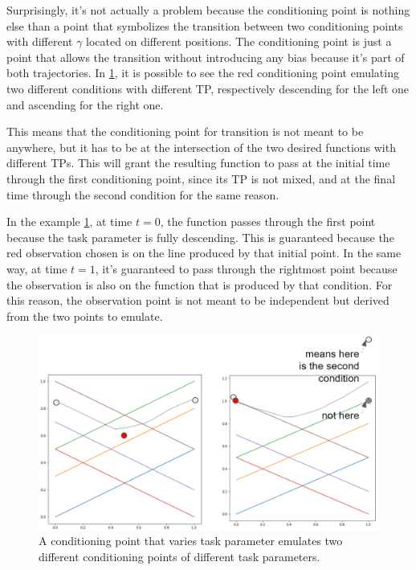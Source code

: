 Surprisingly, it's not actually a problem because the conditioning point is nothing else than a point that symbolizes the transition between two conditioning points with different $\gamma$ located on different positions. The conditioning point is just a point that allows the transition without introducing any bias because it's part of both trajectories. In \cref{fig:tp-condition-point-meaning}, it is possible to see the red conditioning point emulating two different conditions with different TP, respectively descending for the left one and ascending for the right one.

This means that the conditioning point for transition is not meant to be anywhere, but it has to be at the intersection of the two desired functions with different TPs. This will grant the resulting function to pass at the initial time through the first conditioning point, since its TP is not mixed, and at the final time through the second condition for the same reason. 

In the example \cref{fig:tp-condition-point-meaning}, at time $t=0$, the function passes through the first point because the task parameter is fully descending. This is guaranteed because the red observation chosen is on the line produced by that initial point. In the same way, at time $t=1$, it's guaranteed to pass through the rightmost point because the observation is also on the function that is produced by that condition. 
For this reason, the observation point is not meant to be independent but derived from the two points to emulate.

\begin{figure}
    \centering
    \includegraphics[width=0.8\linewidth]{figures/tp-condition-point-meaning.png}
    \caption{ A conditioning point that varies task parameter emulates two different conditioning points of different task parameters. }
    \label{fig:tp-condition-point-meaning}
\end{figure}

